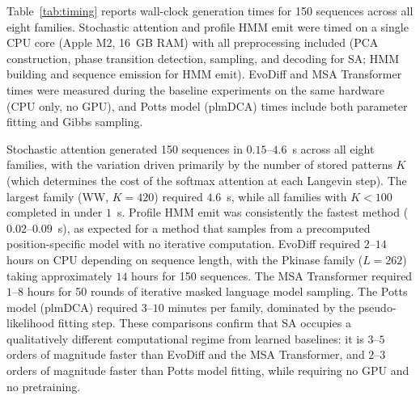 Table~\ref{tab:timing} reports wall-clock generation times for 150 sequences across all eight families. Stochastic attention and profile HMM emit were timed on a single CPU core (Apple M2, 16~GB RAM) with all preprocessing included (PCA construction, phase transition detection, sampling, and decoding for SA; HMM building and sequence emission for HMM emit). EvoDiff and MSA Transformer times were measured during the baseline experiments on the same hardware (CPU only, no GPU), and Potts model (plmDCA) times include both parameter fitting and Gibbs sampling.

Stochastic attention generated 150 sequences in $0.15$--$4.6$~s across all eight families, with the variation driven primarily by the number of stored patterns $K$ (which determines the cost of the softmax attention at each Langevin step). The largest family (WW, $K{=}420$) required $4.6$~s, while all families with $K < 100$ completed in under $1$~s. Profile HMM emit was consistently the fastest method ($0.02$--$0.09$~s), as expected for a method that samples from a precomputed position-specific model with no iterative computation. EvoDiff required $2$--$14$ hours on CPU depending on sequence length, with the Pkinase family ($L{=}262$) taking approximately $14$ hours for 150 sequences. The MSA Transformer required $1$--$8$ hours for 50 rounds of iterative masked language model sampling. The Potts model (plmDCA) required $3$--$10$ minutes per family, dominated by the pseudo-likelihood fitting step. These comparisons confirm that SA occupies a qualitatively different computational regime from learned baselines: it is $3$--$5$ orders of magnitude faster than EvoDiff and the MSA Transformer, and $2$--$3$ orders of magnitude faster than Potts model fitting, while requiring no GPU and no pretraining.

